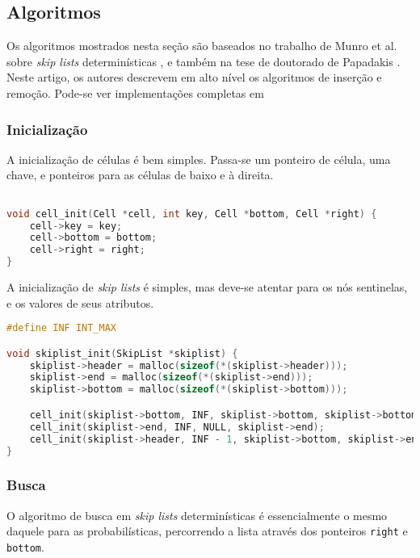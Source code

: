 \documentclass[paper=a4, fontsize=11pt]{scrartcl} %
\numberwithin{equation}{section}
\numberwithin{figure}{section}
\numberwithin{table}{section}
\numberwithin{definition}{section}
\numberwithin{theorem}{section}
\numberwithin{property}{section}
\numberwithin{proposition}{section}
\newcommand{\sls}{\textit{skip lists}\xspace}
\begin{document}
\subsection{Algoritmos}

Os algoritmos mostrados nesta seção são baseados no trabalho de Munro et al.
sobre \sls determinísticas \cite{munro1992deterministic}, e também na tese de doutorado de Papadakis
\cite{papadakis1993skip}. Neste artigo, os autores descrevem 
em alto nível os algoritmos de inserção e remoção.
Pode-se ver implementações completas em 


\subsubsection{Inicialização}

A inicialização de células é bem simples. Passa-se um ponteiro de célula, uma chave, e ponteiros para
as células de baixo e à direita.

\begin{lstlisting}[caption=Inicialização de células de Skip Lists determinísticas, language=C]

void cell_init(Cell *cell, int key, Cell *bottom, Cell *right) {
    cell->key = key;
    cell->bottom = bottom;
    cell->right = right;
}

\end{lstlisting}

A inicialização de \sls é simples, mas deve-se atentar para os nós sentinelas, e os valores de 
seus atributos.

\begin{lstlisting}[caption=Inicialização de Skip Lists determinísticas, language=C]
#define INF INT_MAX

void skiplist_init(SkipList *skiplist) {
    skiplist->header = malloc(sizeof(*(skiplist->header)));
    skiplist->end = malloc(sizeof(*(skiplist->end)));
    skiplist->bottom = malloc(sizeof(*(skiplist->bottom)));

    cell_init(skiplist->bottom, INF, skiplist->bottom, skiplist->bottom);
    cell_init(skiplist->end, INF, NULL, skiplist->end);
    cell_init(skiplist->header, INF - 1, skiplist->bottom, skiplist->end);
}
\end{lstlisting}

\subsubsection{Busca}

O algoritmo de busca em \sls determinísticas é essencialmente o mesmo daquele para as probabilísticas, 
percorrendo a lista através dos ponteiros \verb|right| e \verb|bottom|.
\end{document}
